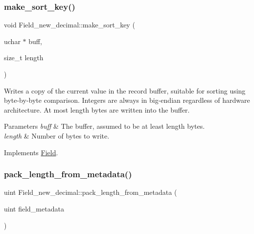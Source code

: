 \subsubsection{\texorpdfstring{make\+\_\+sort\+\_\+key()}{make\_sort\_key()}}
{\footnotesize\ttfamily void Field\+\_\+new\+\_\+decimal\+::make\+\_\+sort\+\_\+key (\begin{DoxyParamCaption}\item[{uchar $\ast$}]{buff,  }\item[{size\+\_\+t}]{length }\end{DoxyParamCaption})\hspace{0.3cm}{\ttfamily [virtual]}}

Writes a copy of the current value in the record buffer, suitable for sorting using byte-\/by-\/byte comparison. Integers are always in big-\/endian regardless of hardware architecture. At most length bytes are written into the buffer.


\begin{DoxyParams}{Parameters}
{\em buff} & The buffer, assumed to be at least length bytes.\\
\hline
{\em length} & Number of bytes to write. \\
\hline
\end{DoxyParams}


Implements \mbox{\hyperlink{classField_af3bc27d237b6ae6ef3dc7a2aec3d79ac}{Field}}.

\mbox{\label{classField__new__decimal_a295d3ea96855ddbf89b6e890b5ac1e2d}} 
\subsubsection{\texorpdfstring{pack\+\_\+length\+\_\+from\+\_\+metadata()}{pack\_length\_from\_metadata()}}
{\footnotesize\ttfamily uint Field\+\_\+new\+\_\+decimal\+::pack\+\_\+length\+\_\+from\+\_\+metadata (\begin{DoxyParamCaption}\item[{uint}]{field\+\_\+metadata }\end{DoxyParamCaption})\hspace{0.3cm}{\ttfamily [virtual]}}

